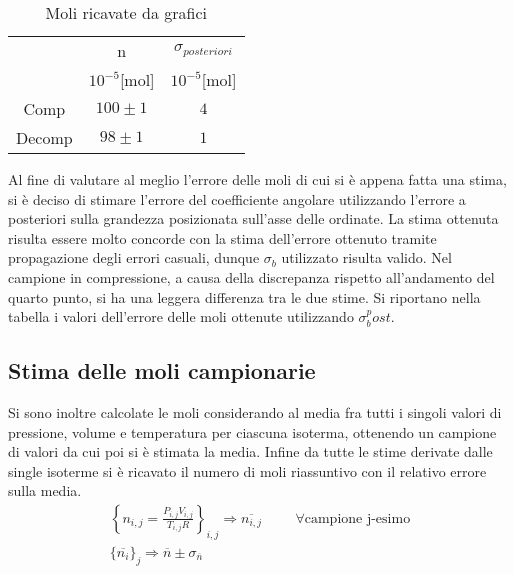 \documentclass[a4paper,11pt,oneside]{article}
\begin{document}
\begin{table}[h!]
    \centering
    \begin{tabular}{|c|c|c|}
        \cline{2-3}
        \multicolumn{1}{c|}{}& n & $\sigma_{posteriori}$\\ 
        \multicolumn{1}{c|}{}& $10^{-5}$[mol] & $10^{-5}$[mol]\\\hline
        \rowcolor[rgb]{0.85,0.85,0.85}Comp & $100\pm1$ & $4$\\ \hline
        Decomp & $98\pm1$ & $1$\\ \hline
    \end{tabular}
    \caption{Moli ricavate da grafici}
    \label{tab:moli_grafici}
\end{table}

Al fine di valutare al meglio l'errore delle moli di cui si è appena fatta una stima, si è deciso di stimare l'errore del coefficiente angolare utilizzando l'errore a posteriori sulla grandezza posizionata sull'asse delle ordinate. La stima ottenuta risulta essere molto concorde con la stima  dell'errore ottenuto tramite propagazione degli errori casuali, dunque $\sigma_b$ utilizzato risulta valido. Nel campione in compressione, a causa della discrepanza rispetto all'andamento del quarto punto, si ha una leggera differenza tra le due stime.
Si riportano nella tabella i valori dell'errore delle moli ottenute utilizzando $\sigma_b^post$.









\subsection{Stima delle moli campionarie}\label{par:moli_campionarie}
Si sono inoltre calcolate le moli considerando al media fra tutti i singoli valori di pressione, volume e temperatura per ciascuna isoterma, ottenendo un campione di valori da cui poi si è stimata la media. Infine da tutte le stime derivate dalle single isoterme si è ricavato il numero di moli riassuntivo con il relativo errore sulla media.
\begin{gather*}
    \left \{n_{i, j}=\frac{P_{i, j}V_{i, j}}{T_{i, j}R}\right \}_{i, j} \Rightarrow \overline{n_{i, j}} \hspace{1cm}\forall \text{campione j-esimo}\\
    \{\overline{n_{i}}\}_{j} \Rightarrow \overline{n}\pm \sigma_{\overline{n}}
\end{gather*}
\end{document}
